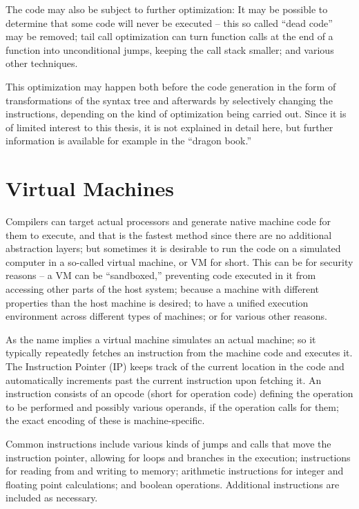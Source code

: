 		The code may also be subject to further optimization: It may be possible to determine that some code will never be executed -- this so called ``dead code'' may be removed; tail call optimization can turn function calls at the end of a function into unconditional jumps, keeping the call stack smaller; and various other techniques.
		
		This optimization may happen both before the code generation in the form of transformations of the syntax tree and afterwards by selectively changing the instructions, depending on the kind of optimization being carried out. Since it is of limited interest to this thesis, it is not explained in detail here, but further information is available for example in the ``dragon book\cite{dragon-book}.''

	\section{Virtual Machines}
	
		Compilers can target actual processors and generate native machine code for them to execute, and that is the fastest method since there are no additional abstraction layers; but sometimes it is desirable to run the code on a simulated computer in a so-called virtual machine, or VM for short. This can be for security reasons -- a VM can be ``sandboxed,'' preventing code executed in it from accessing other parts of the host system; because a machine with different properties than the host machine is desired; to have a unified execution environment across different types of machines; or for various other reasons\cite{compilerbau}.
		
		As the name implies a virtual machine simulates an actual machine; so it typically repeatedly fetches an instruction from the machine code and executes it. The Instruction Pointer (IP) keeps track of the current location in the code and automatically increments past the current instruction upon fetching it. An instruction consists of an opcode (short for operation code) defining the operation to be performed and possibly various operands, if the operation calls for them; the exact encoding of these is machine-specific.
		
		Common instructions include various kinds of jumps and calls that move the instruction pointer, allowing for loops and branches in the execution; instructions for reading from and writing to memory; arithmetic instructions for integer and floating point calculations; and boolean operations. Additional instructions are included as necessary.
		
